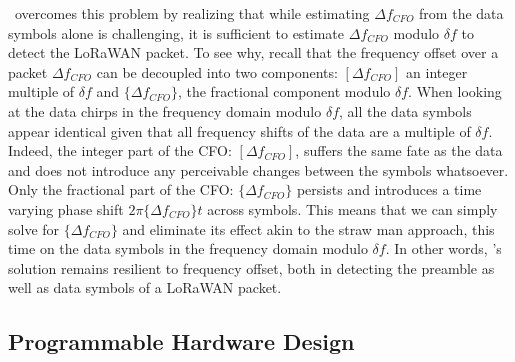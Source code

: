 \name\ overcomes this problem by realizing that while estimating $\Delta f_{CFO}$ from the data symbols alone is challenging, it is sufficient to estimate $\Delta f_{CFO}$ modulo $\delta f$ to detect the LoRaWAN packet. To see why, recall that the frequency offset over a packet $\Delta f_{CFO}$ can be decoupled into two components: $[\Delta f_{CFO}]$ an integer multiple of  $\delta f$ and $\{\Delta f_{CFO}\}$, the  fractional component modulo $\delta f$. When looking at the data chirps in the frequency domain modulo $\delta f$, all the data symbols appear identical given that all frequency shifts of the data are a multiple of  $\delta f$. Indeed, the integer part of the CFO: $[\Delta f_{CFO}]$, suffers the same fate as the data and does not introduce any perceivable changes between the symbols whatsoever. Only the fractional part of the CFO: $\{\Delta f_{CFO}\}$ persists and introduces a time varying phase shift $2 \pi \{\Delta f_{CFO}\} t$ across symbols. This means that we can simply solve for $\{\Delta f_{CFO}\}$ and eliminate its effect akin to the straw man approach, this time on the data symbols in the frequency domain modulo $\delta f$. In other words, \name's solution remains resilient to frequency offset, both in detecting the preamble as well as data symbols of a LoRaWAN packet. 





\subsection{Programmable Hardware Design}
\label{sec:hardware}


